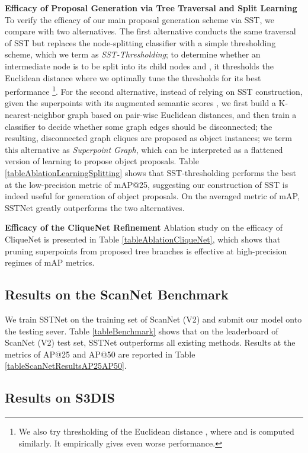 \documentclass[10pt,twocolumn,letterpaper]{article}
\begin{document}
\noindent\textbf{Efficacy of Proposal Generation via Tree Traversal and Split Learning} To verify the efficacy of our main proposal generation scheme via SST, we compare with two alternatives. The first alternative conducts the same traversal of SST but replaces the node-splitting classifier  with a simple thresholding scheme, which we term as \emph{SST-Thresholding}; to determine whether an intermediate node  is to be split into its child nodes  and , it thresholds the Euclidean distance  where we optimally tune the thresholds for its best performance \footnote{We also try thresholding of the Euclidean distance , where  and  is computed similarly. It empirically gives even worse performance. }. For the second alternative, instead of relying on SST construction, given the  superpoints with its augmented semantic scores , we first build a K-nearest-neighbor graph based on pair-wise Euclidean distances, and then train a classifier to decide whether some graph edges should be disconnected; the resulting, disconnected graph cliques are proposed as object instances; we term this alternative as \emph{Superpoint Graph}, which can be interpreted as a flattened version of learning to propose object proposals. Table \ref{tableAblationLearningSplitting} shows that SST-thresholding performs the best at the low-precision metric of mAP@25, suggesting our construction of SST is indeed useful for generation of object proposals. On the averaged metric of mAP, SSTNet greatly outperforms the two alternatives.

\noindent\textbf{Efficacy of the CliqueNet Refinement} Ablation study on the efficacy of CliqueNet is presented in Table \ref{tableAblationCliqueNet}, which shows that pruning superpoints from proposed tree branches is effective at high-precision regimes of mAP metrics.

\subsection{Results on the ScanNet Benchmark}
\label{subsecScanNetBenchmark}
We train SSTNet on the training set of  ScanNet (V2) and submit our model onto the testing sever. Table \ref{tableBenchmark} shows that on the leaderboard of ScanNet (V2) test set, SSTNet outperforms all existing methods. Results at the metrics of AP@25 and AP@50 are reported in Table \ref{tableScanNetResultsAP25AP50}.
\vspace{-0.1cm}
 

\subsection{Results on S3DIS}
\label{subsecS3DIS}
\end{document}
